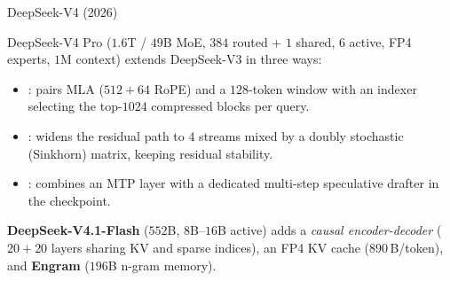 \documentclass[11pt,aspectratio=169]{beamer}
\begin{document}
\begin{frame}{DeepSeek-V4 (2026)}
    \setlength{\parskip}{4pt}

    DeepSeek-V4 Pro ($1.6$T / $49$B MoE, $384$ routed + $1$ shared, $6$
    active, FP4 experts, $1$M context) extends DeepSeek-V3 in three ways:
    \begin{itemize}
        \setlength{\itemsep}{3pt}
        \item {}: pairs MLA ($512+64$
              RoPE) and a $128$-token window with an indexer selecting the
              top-$1024$ compressed blocks per query.
        \item {}: widens
              the residual path to $4$ streams mixed by a doubly stochastic
              (Sinkhorn) matrix, keeping residual stability.
        \item {}: combines an MTP layer with a dedicated
              multi-step speculative drafter in the checkpoint.
    \end{itemize}

    \textbf{DeepSeek-V4.1-Flash} ($552$B, $8$B--$16$B active) adds a
    \emph{causal encoder-decoder} ($20+20$ layers sharing KV and sparse
    indices), an FP4 KV cache ($890$\,B/token), and \textbf{Engram} ($196$B
    n-gram memory).


\end{frame}
\end{document}
